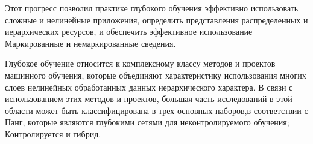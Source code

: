 \begin{frame}

    Этот прогресс позволил практике глубокого обучения эффективно использовать сложные и нелинейные приложения,
    определить представления распределенных и иерархических ресурсов,
    и обеспечить эффективное использование Маркированные и немаркированные сведения.

    Глубокое обучение относится к комплексному классу методов и проектов машинного обучения, которые объединяют характеристику 
    использования многих слоев нелинейных обработанных данных иерархического характера. В связи с использованием этих методов и проектов,
    большая часть исследований в этой области может быть классифицирована в трех основных наборов,в соответствии с Панг,
    которые являются глубокими сетями для неконтролируемого обучения; Контролируется и гибрид.

\end{frame}
